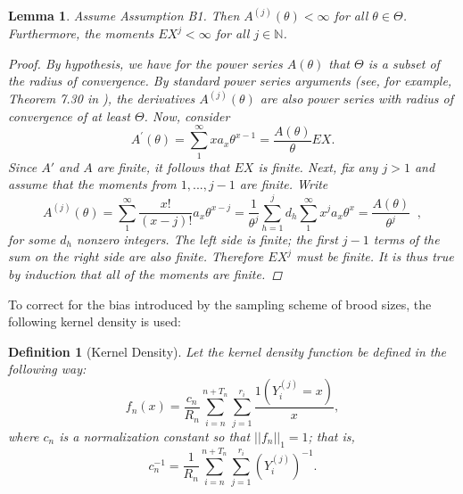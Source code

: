 \documentclass[11 pt]{article}
\newtheorem{lem}{Lemma}
\newtheorem{defn}{Definition} %
\renewcommand{\th}{\theta}
\newcommand{\fb}[1]{ \mathop{ \left[ #1 \right] } }
\begin{document}
\begin{lem}
\label{lem:moments}
Assume Assumption B1. Then $A^{(j)}(\th) < \infty$ for all $\th \in \Theta$. Furthermore, the moments $EX^j < \infty$ for all $j \in \mathbb{N}$. 
\begin{proof}
By hypothesis, we have for the power series $A(\th)$ that $\Theta$ is a subset of the radius of convergence. By standard power series arguments (see, for example, Theorem 7.30 in \cite{wade2010an}), the derivatives $A^{(j)}(\th)$ are also power series with radius of convergence of at least $\Theta$. 
Now, consider
\[
A^{'}(\th) = \sum_{1}^{\infty} x a_x \th^{x-1} = \frac{A(\th)}{\th}EX.
\]
Since $A'$ and $A$ are finite, it follows that $EX$ is finite. Next, fix any $j > 1$  and assume that the moments from $1,...,j-1$ are finite. Write
\[
A^{(j)}(\th) = \sum_1^{\infty} \frac{x!}{(x-j)!}a_x\th^{x-j} = \frac{1}{\th^j} \sum_{h=1}^{j} d_h \sum_1^{\infty} x^ja_x\th^{x}=  \frac{A(\th)}{\th^j} \fb{\sum_{h=1}^{j} d_h EX^h},
\]
for some $d_h$ nonzero integers. The left side is finite; the first $j-1$ terms of the sum on the right side are also finite. Therefore $EX^j$ must be finite. It is thus true by induction that all of the moments are finite. 
\end{proof}
\end{lem}

\newcommand{\of}{f_{\theta}(x)}
\newcommand{\kerna}{f_n(x)}
\newcommand{\oft}{f^{\frac{1}{2}}_{\theta}(x)}
\newcommand{\kernat}{f^{\frac{1}{2}}_n(x)}
\newcommand{\ofX}{f_{\theta}(X)}
\newcommand{\kernaX}{f_n(X)}
\newcommand{\oftX}{f^{\frac{1}{2}}_{\theta}(X)}
\newcommand{\kernatX}{f^{\frac{1}{2}}_n(X)}
\newcommand{\ofapp}{f_{\theta,\text{app}}(x)}

To correct for the bias introduced by the sampling scheme of brood sizes, the following kernel density is used:

\begin{defn}[Kernel Density] Let the kernel density function be defined in the following way:
\[
f_n(x) = \frac{c_n}{R_n} \sum_{i=n}^{n + T_n}\sum_{j=1}^{r_i} \frac{1(Y_i^{(j)}=x)}{x},
\]
where $c_n$ is a normalization constant so that $||f_n||_1 =1$; that is,
\[
c_n^{-1} = \frac{1}{R_n} \sum_{i=n}^{n + T_n}\sum_{j=1}^{r_i} \left(Y_i^{(j)} \right)^{-1}.
\]
\end{defn}
\end{document}
